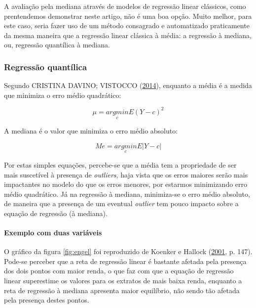 \documentclass[a4paper, 12pt]{article}
\let\oldparagraph\paragraph
\renewcommand{\paragraph}[1]{\oldparagraph{#1}\mbox{}}
\begin{document}
A avaliação pela mediana através de modelos de regressão linear
clássicos, como prentendemos demonstrar neste artigo, não é uma boa
opção. Muito melhor, para este caso, seria fazer uso de um método
consagrado e automatizado praticamente da mesma maneira que a regressão
linear clássica à média: a regressão à mediana, ou, regressão quantílica
à mediana.

\subsubsection{Regressão quantílica}\label{regressao-quantilica}

Segundo CRISTINA DAVINO; VISTOCCO (\protect\hyperlink{ref-QR}{2014}),
enquanto a média é a medida que minimiza o erro médio quadrático:

\[\mu = \underset{c}{argmin} E(Y - c)^2\]

A mediana é o valor que minimiza o erro médio absoluto:

\[Me = \underset{c}{argmin} E|Y-c|\]

Por estas simples equações, percebe-se que a média tem a propriedade de
ser mais suscetível à presença de \emph{outliers}, haja vista que os
erros maiores serão mais impactantes no modelo do que os erros menores,
por estarmos minimizando erro médio quadrático. Já na regressão à
mediana, minimiza-se o erro médio absoluto, de maneira que a presença de
um eventual \emph{outlier} tem pouco impacto sobre a equação de
regressão (à mediana).

\paragraph{Exemplo com duas variáveis}\label{exemplo-com-duas-variaveis}

O gráfico da figura \ref{fig:engel} foi reproduzido de Koenker e Hallock
(\protect\hyperlink{ref-koenker}{2001}, p. 147). Pode-se perceber que a
reta de regressão linear é bastante afetada pela presença dos dois
pontos com maior renda, o que faz com que a equação de regressão linear
superestime os valores para os extratos de mais baixa renda, enquanto a
reta de regressão à mediana apresenta maior equilíbrio, não sendo tão
afetada pela presença destes pontos.
\end{document}
